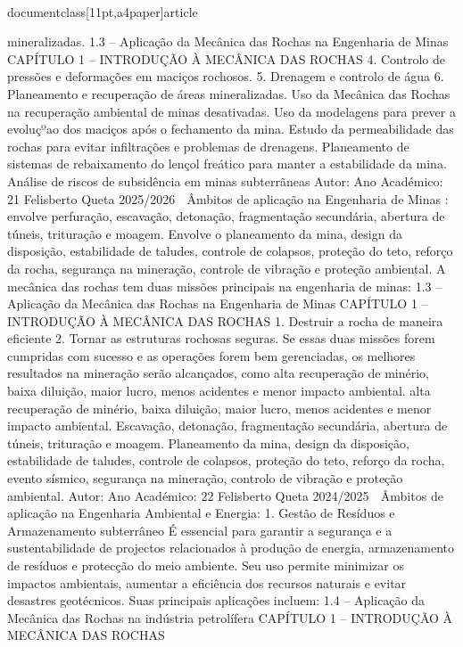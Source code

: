 \\documentclass[11pt,a4paper]{article}
\begin{document}
mineralizadas.
1.3 – Aplicação da Mecânica das Rochas na Engenharia de Minas
CAPÍTULO 1 
–
 INTRODUÇÃO À MECÂNICA DAS ROCHAS
4. Controlo de pressões e deformações em 
maciços rochosos.
5. Drenagem e controlo de água
6. Planeamento e recuperação de áreas 
mineralizadas.
Uso da Mecânica das Rochas na recuperação ambiental de minas 
desativadas.
Uso da modelagens para prever a evoluçºao dos maciços após o 
fechamento da mina.
Estudo da permeabilidade das rochas para evitar infiltrações e
problemas de drenagens.
Planeamento de sistemas de rebaixamento do lençol freático para 
manter a estabilidade da mina.
Análise de riscos de subsidência em minas subterrãneas
Autor:
Ano Académico:
21
Felisberto Queta
2025/2026

 Âmbitos de aplicação na Engenharia de Minas
:
envolve perfuração, escavação, detonação, fragmentação secundária,
abertura de túneis, trituração e moagem.
Envolve o planeamento da mina, design da disposição, estabilidade de 
taludes, controle de colapsos, proteção do teto, reforço da rocha, 
segurança na mineração, controle de vibração e proteção ambiental.
A mecânica das rochas tem duas missões principais na engenharia de minas:
1.3 – Aplicação da Mecânica das Rochas na Engenharia de Minas
CAPÍTULO 1 
–
 INTRODUÇÃO À MECÂNICA DAS ROCHAS
1. Destruir a rocha de maneira eficiente
2. Tornar as estruturas rochosas seguras.
Se essas duas missões forem cumpridas com sucesso e as operações forem bem gerenciadas, os melhores resultados na 
mineração serão alcançados, como alta recuperação de minério, baixa diluição, maior lucro, menos acidentes e menor 
impacto ambiental.
alta recuperação de 
minério, baixa 
diluição, maior lucro, 
menos acidentes e 
menor impacto 
ambiental.
Escavação, detonação, 
fragmentação 
secundária, abertura de 
túneis, trituração e 
moagem.
Planeamento da mina, 
design da disposição, 
estabilidade de taludes, 
controle de colapsos, 
proteção do teto, reforço 
da rocha, evento 
sísmico, segurança na 
mineração, controlo de 
vibração e proteção 
ambiental.
Autor:
Ano Académico:
22
Felisberto Queta
2024/2025

 Âmbitos de aplicação 
na Engenharia Ambiental e Energia:
1. Gestão de Resíduos e Armazenamento subterrâneo
É essencial para garantir a segurança e a sustentabilidade de projectos relacionados à produção de energia,
armazenamento de resíduos e protecção do meio ambiente. Seu uso permite minimizar os impactos ambientais, aumentar a
eficiência dos recursos naturais e evitar desastres geotécnicos. Suas principais aplicações incluem:
1.4 – Aplicação da Mecânica das Rochas na indústria petrolífera
CAPÍTULO 1 
–
 INTRODUÇÃO À MECÂNICA DAS ROCHAS
\end{document}
